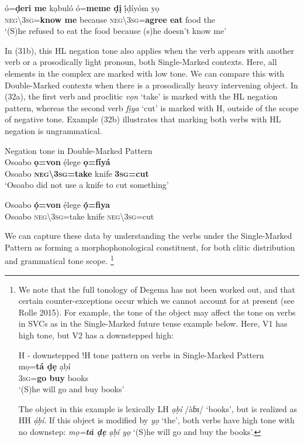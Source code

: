 \documentclass[output=paper]{langsci/langscibook}
\begin{document}
\ea
\gll   ó=\textbf{ḍeri       me}   kạbuló   ó=\textbf{meme     ḍị}   ị́ḍíyóm   yọ\\
     \textsc{neg{\textbackslash}3sg}=\textbf{know  me}    because   \textsc{neg{\textbackslash}3sg}=\textbf{agree   eat}   food   the\\
\glt ‘(S)he refused to eat the food because (s)he doesn’t know me’ \citep[45]{Kari2004}  
\z

In (31b), this HL negation tone also applies when the verb appears with another verb or a prosodically light pronoun, both Single-Marked contexts. Here, all elements in the complex are marked with low tone. We can compare this with Double-Marked contexts when there is a prosodically heavy intervening object. In (32a), the first verb and proclitic \textit{vọn} ‘take’ is marked with the HL negation pattern, whereas the second verb \textit{fịya} ‘cut’ is marked with H, outside of the scope of negative tone. Example (32b) illustrates that marking both verbs with HL negation is ungrammatical. 

\ea
{Negation tone in Double-Marked Pattern}\\
\gll   Osoabo   \textbf{ọ=von}       ẹ́lege   \textbf{ọ=fíyá}\\
     Osoabo   \textbf{\textsc{neg{\textbackslash}3sg}}\textbf{=take}   knife   \textbf{3}\textbf{\textsc{sg}}\textbf{=cut}\\
\glt ‘Osoabo did not use a knife to cut something’ \citep[111]{Kari2004}
\z

\ea
\gll   *Osoabo  \textbf{ọ́=von}       ẹ́lege   \textbf{ọ́=fiya}\\
     Osoabo   \textsc{neg{\textbackslash}3sg}=take   knife   \textsc{neg{\textbackslash}}3\textsc{sg}=cut\\
\z

We can capture these data by understanding the verbs under the Single-Marked Pattern as forming a morphophonological constituent, for both clitic distribution and grammatical tone scope.%
\footnote{We 
  note that the full tonology of Degema has not been worked out, and that certain counter-exceptions occur which we cannot account for at present (see Rolle 2015). For example, the tone of the object may affect the tone on verbs in SVCs as in the Single-Marked future tense example below. Here, V1 has high tone, but V2 has a downstepped high:

  \ea
  H - downstepped !H tone pattern on verbs in Single-Marked Pattern\\
  \gll mọ=\textbf{tá    ḍẹ }  ạḅí\\
  3\textsc{sg}=\textbf{go  buy }  books\\
  \glt ‘(S)he will go and buy books’ 
  \z 


  The object in this example is lexically LH \textit{ạḅí }/àɓɪ/ ‘books’, but is realized as HH \textit{ạ́ḅí}. If this object is modified by \textit{yọ} ‘the’, both verbs have high tone with no downstep: \textit{mọ=}\textbf{\textit{tá ḍẹ }}\textit{ạḅí yọ} ‘(S)he will go and buy the books’. 
}
\end{document}
